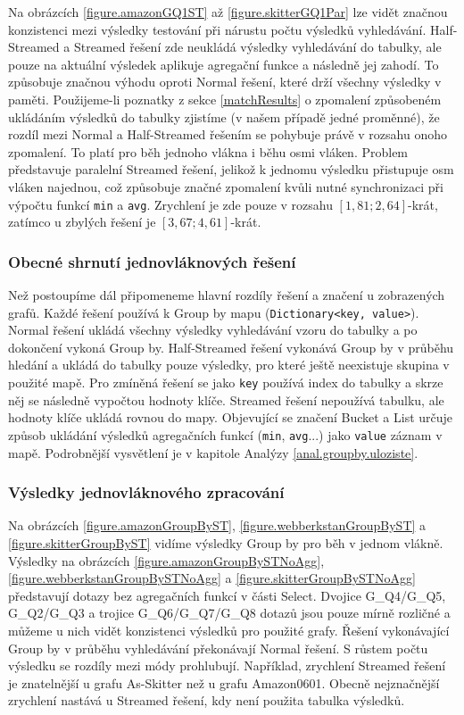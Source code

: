 Na obrázcích \ref{figure.amazonGQ1ST} až \ref{figure.skitterGQ1Par} lze vidět značnou konzistenci mezi výsledky testování při nárustu počtu výsledků vyhledávání.
Half-Streamed a Streamed řešení zde neukládá výsledky vyhledávání do tabulky, ale pouze na aktuální výsledek aplikuje agregační funkce a následně jej zahodí.
To způsobuje značnou výhodu oproti Normal řešení, které drží všechny výsledky v paměti.
Použijeme-li poznatky z sekce \ref{matchResults} o zpomalení způsobeném ukládáním výsledků do tabulky zjistíme (v našem případě jedné proměnné), že rozdíl mezi Normal a Half-Streamed řešením se pohybuje právě v rozsahu onoho zpomalení.
To platí pro běh jednoho vlákna i běhu osmi vláken. 
Problem představuje paralelní Streamed řešení, jelikož k jednomu výsledku přistupuje osm vláken najednou, což způsobuje značné zpomalení kvůli nutné synchronizaci při výpočtu funkcí \verb+min+ a \verb+avg+. 
Zrychlení je zde pouze v rozsahu $[1,81; 2,64]$-krát, zatímco u zbylých řešení je $[3,67; 4,61]$-krát.

\subsubsection{Obecné shrnutí jednovláknových řešení}

Než postoupíme dál připomeneme hlavní rozdíly řešení a značení u zobrazených grafů. 
Každé řešení používá k Group by mapu (\verb+Dictionary<key, value>+).
Normal řešení ukládá všechny výsledky vyhledávání vzoru do tabulky a po dokončení vykoná Group by. 
Half-Streamed řešení vykonává Group by v průběhu hledání a ukládá do tabulky pouze výsledky, pro které ještě neexistuje skupina v použité mapě.
Pro zmíněná řešení se jako \verb+key+ používá index do tabulky a skrze něj se následně vypočtou hodnoty klíče.
Streamed řešení nepoužívá tabulku, ale hodnoty klíče ukládá rovnou do mapy. 
Objevující se značení Bucket a List určuje způsob ukládání výsledků agregačních funkcí (\verb+min+, \verb+avg+...) jako \verb+value+ záznam v mapě.
Podrobnější vysvětlení je v kapitole Analýzy \ref{anal.groupby.uloziste}.


\subsubsection{Výsledky jednovláknového zpracování}

Na obrázcích \ref{figure.amazonGroupByST}, \ref{figure.webberkstanGroupByST} a \ref{figure.skitterGroupByST} vidíme výsledky Group by pro běh v jednom vlákně.
Výsledky na obrázcích \ref{figure.amazonGroupBySTNoAgg}, \ref{figure.webberkstanGroupBySTNoAgg} a \ref{figure.skitterGroupBySTNoAgg} představují dotazy bez agregačních funkcí v části Select.
Dvojice G\_Q4/G\_Q5, G\_Q2/G\_Q3 a trojice G\_Q6/G\_Q7/G\_Q8 dotazů jsou pouze mírně rozličné a můžeme u nich vidět konzistenci výsledků pro použité grafy.
Řešení vykonávající Group by v průběhu vyhledávání překonávají Normal řešení.
S růstem počtu výsledku se rozdíly mezi módy prohlubují. 
Například, zrychlení Streamed řešení je znatelnější u grafu As-Skitter než u grafu Amazon0601. 
Obecně nejznačnější zrychlení nastává u Streamed řešení, kdy není použita tabulka výsledků.

